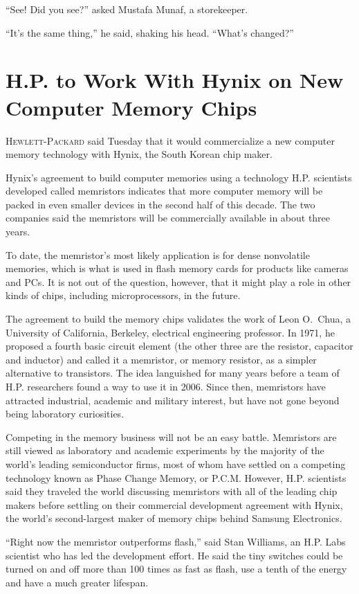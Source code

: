 ﻿\documentclass[12pt]{article}
\begin{document}
``See! Did you see?'' asked Mustafa Munaf, a storekeeper.

``It's the same thing,'' he said, shaking his head. ``What's changed?''

\pagebreak
\section{H.P. to Work With Hynix on New Computer Memory Chips}

\lettrine{H}{ewlett-Packard} said Tuesday that it would commercialize a new
computer memory technology with Hynix, the South Korean chip maker.

Hynix's agreement to build computer memories using a technology H.P. scientists developed called
memristors indicates that more computer memory will be packed in even smaller devices in the second
half of this decade. The two companies said the memristors will be commercially available in about
three years.

To date, the memristor's most likely application is for dense nonvolatile memories, which is what is
used in flash memory cards for products like cameras and PCs. It is not out of the question,
however, that it might play a role in other kinds of chips, including microprocessors, in the
future.

The agreement to build the memory chips validates the work of Leon O.~Chua, a University of
California, Berkeley, electrical engineering professor. In 1971, he proposed a fourth basic circuit
element (the other three are the resistor, capacitor and inductor) and called it a memristor, or
memory resistor, as a simpler alternative to transistors. The idea languished for many years before
a team of H.P. researchers found a way to use it in 2006. Since then, memristors have attracted
industrial, academic and military interest, but have not gone beyond being laboratory curiosities.

Competing in the memory business will not be an easy battle. Memristors are still viewed as
laboratory and academic experiments by the majority of the world's leading semiconductor firms, most
of whom have settled on a competing technology known as Phase Change Memory, or P.C.M. However, H.P.
scientists said they traveled the world discussing memristors with all of the leading chip makers
before settling on their commercial development agreement with Hynix, the world's second-largest
maker of memory chips behind Samsung Electronics.

``Right now the memristor outperforms flash,'' said Stan Williams, an H.P. Labs scientist who has
led the development effort. He said the tiny switches could be turned on and off more than 100 times
as fast as flash, use a tenth of the energy and have a much greater lifespan.
\end{document}
